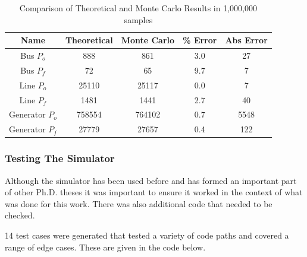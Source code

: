 \documentclass[a4paper,oneside,12pt]{report}
\begin{document}
\begin{table}[!t]
\renewcommand{\arraystretch}{1.3}
\caption{Comparison of Theoretical and Monte Carlo Results in 1,000,000 samples}
\label{table_cmp}
\centering
\begin{tabular}{c||c||c||c||c}
\bfseries Name &\bfseries Theoretical & \bfseries Monte Carlo &
\bfseries \% Error & \bfseries Abs Error\\
\hline\hline
Bus $P_o$	&  888	  &   861     &	 3.0	  &    27    \\
Bus $P_f$	&  72	  &   65      &  9.7	  &    7     \\
Line $P_o$	&  25110  &   25117   &  0.0	  &    7     \\
Line $P_f$	&  1481	  &   1441    &  2.7	  &    40    \\
Generator $P_o$ &  758554 &   764102  &  0.7    &    5548  \\
Generator $P_f$ &  27779  &   27657   &  0.4    &    122   \\
\hline
\end{tabular}
\end{table}

\subsubsection{Testing The Simulator}

Although the simulator has been used before and has formed an important
part of other Ph.D. theses \cite{Dale1986, Berry1989, Chan1992} it was
important to ensure it worked in the context of what was done for this
work. There was also additional code that needed to be checked.

14 test cases were generated that tested a variety of code paths and
covered a range of edge cases. These are given in the code below.
\end{document}
